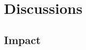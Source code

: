 \documentclass[runningheads]{llncs}
\begin{document}




\section{Discussions}

\subsection{Impact}
\end{document}
